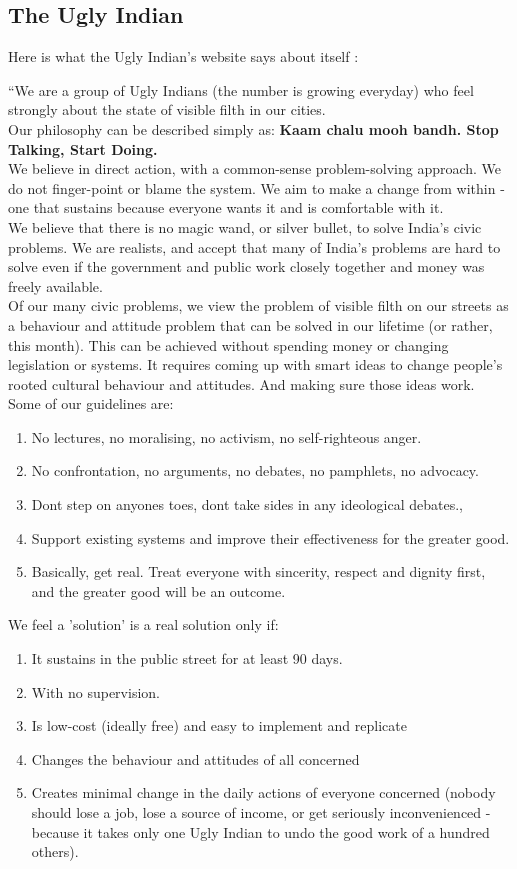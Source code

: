 \documentclass[10pt]{article}
\begin{document}
\subsection{The Ugly Indian}

Here is what the Ugly Indian's website says about itself \citep{TheUglyIndian:about}:

``We are a group of Ugly Indians (the number is growing everyday) who feel strongly about the state of visible filth in our cities.\\
Our philosophy can be described simply as: \textbf{Kaam chalu mooh bandh. Stop Talking, Start Doing.}\\
We believe in direct action, with a common-sense problem-solving approach. We do not finger-point or blame the system. We aim to make a change from within - one that sustains because everyone wants it and is comfortable with it.\\
We believe that there is no magic wand, or silver bullet, to solve India's civic problems. We are realists, and accept that many of India's problems are hard to solve even if the government and public work closely together and money was freely available.\\
Of our many civic problems, we view the problem of visible filth on our streets as a behaviour and attitude problem that can be solved in our lifetime (or rather, this month). This can be achieved without spending money or changing legislation or systems. It requires coming up with smart ideas to change people's rooted cultural behaviour and attitudes. And making sure those ideas work.\\
Some of our guidelines are:
\begin{enumerate}
\item No lectures, no moralising, no activism, no self-righteous anger.
\item No confrontation, no arguments, no debates, no pamphlets, no advocacy.
\item Dont step on anyones toes, dont take sides in any ideological debates.,
\item Support existing systems and improve their effectiveness for the greater good.
\item Basically, get real. Treat everyone with sincerity, respect and dignity first, and the greater good will be an outcome.
\end{enumerate}
We feel a 'solution' is a real solution only if:
\begin{enumerate}
\item It sustains in the public street for at least 90 days.
\item With no supervision.
\item Is low-cost (ideally free) and easy to implement and replicate
\item Changes the behaviour and attitudes of all concerned
\item Creates minimal change in the daily actions of everyone concerned
    (nobody should lose a job, lose a source of income, or get seriously
    inconvenienced - because it takes only one Ugly Indian to undo the
    good work of a hundred others).
\end{enumerate}
\end{document}
